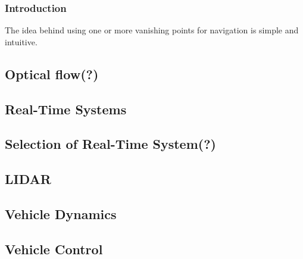 \subsubsection{Introduction}

The idea behind using one or more vanishing points for navigation is simple and intuitive. 


\subsection{Optical flow(?)}

\subsection{Real-Time Systems}

\subsection{Selection of Real-Time System(?)}

\subsection{LIDAR}

\subsection{Vehicle Dynamics}

\subsection{Vehicle Control}

